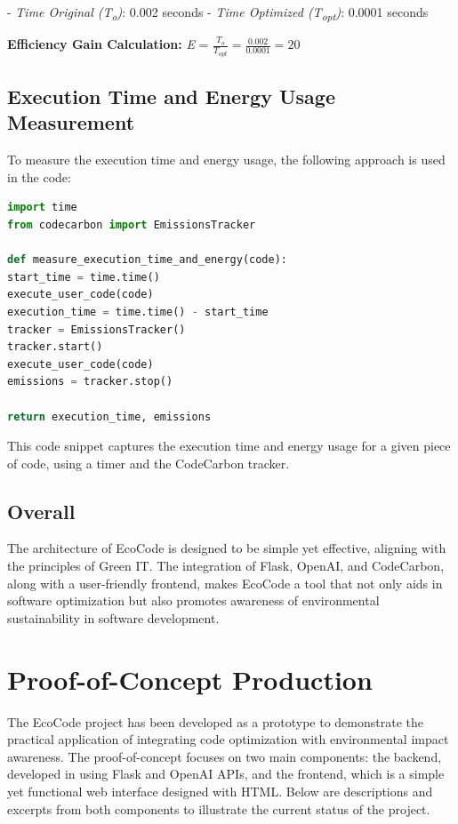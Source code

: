 \documentclass[conference,compsoc]{IEEEtran}
\begin{document}
- \textit{Time Original (T\textsubscript{o})}: 0.002 seconds
- \textit{Time Optimized (T\textsubscript{opt})}: 0.0001 seconds

\textbf{Efficiency Gain Calculation:}
\textit{E} = \(\frac{T_{o}}{T_{opt}} = \frac{0.002}{0.0001} = 20\)

\subsection{Execution Time and Energy Usage Measurement}
To measure the execution time and energy usage, the following approach is used in the code:

\begin{lstlisting}[language=Python, backgroundcolor=\color{lightgray}]
import time
from codecarbon import EmissionsTracker

def measure_execution_time_and_energy(code):
start_time = time.time()
execute_user_code(code)
execution_time = time.time() - start_time
tracker = EmissionsTracker()
tracker.start()
execute_user_code(code)
emissions = tracker.stop()

return execution_time, emissions
\end{lstlisting}

This code snippet captures the execution time and energy usage for a given piece of code, using a timer and the CodeCarbon tracker.

\subsection{Overall}
The architecture of EcoCode is designed to be simple yet effective, aligning with the principles of Green IT. The integration of Flask, OpenAI, and CodeCarbon, along with a user-friendly frontend, makes EcoCode a tool that not only aids in software optimization but also promotes awareness of environmental sustainability in software development.

\section{Proof-of-Concept Production}
The EcoCode project has been developed as a prototype to demonstrate the practical application of integrating code optimization with environmental impact awareness. The proof-of-concept focuses on two main components: the backend, developed in  using Flask and OpenAI APIs, and the frontend, which is a simple yet functional web interface designed with HTML. Below are descriptions and excerpts from both components to illustrate the current status of the project.
\end{document}
